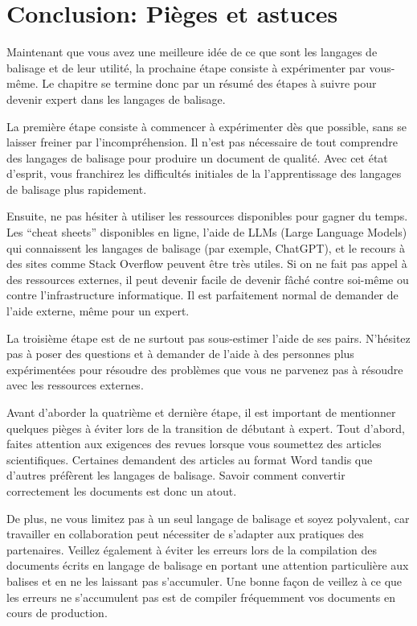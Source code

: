 \documentclass[
  letterpaper,
  DIV=11,
  numbers=noendperiod]{scrreprt}
\begin{document}
\section{Conclusion: Pièges et
astuces}\label{conclusion-piuxe8ges-et-astuces}

Maintenant que vous avez une meilleure idée de ce que sont les langages
de balisage et de leur utilité, la prochaine étape consiste à
expérimenter par vous-même. Le chapitre se termine donc par un résumé
des étapes à suivre pour devenir expert dans les langages de balisage.

La première étape consiste à commencer à expérimenter dès que possible,
sans se laisser freiner par l'incompréhension. Il n'est pas nécessaire
de tout comprendre des langages de balisage pour produire un document de
qualité. Avec cet état d'esprit, vous franchirez les difficultés
initiales de la l'apprentissage des langages de balisage plus
rapidement.

Ensuite, ne pas hésiter à utiliser les ressources disponibles pour
gagner du temps. Les ``cheat sheets'' disponibles en ligne, l'aide de
LLMs (Large Language Models) qui connaissent les langages de balisage
(par exemple, ChatGPT), et le recours à des sites comme Stack Overflow
peuvent être très utiles. Si on ne fait pas appel à des ressources
externes, il peut devenir facile de devenir fâché contre soi-même ou
contre l'infrastructure informatique. Il est parfaitement normal de
demander de l'aide externe, même pour un expert.

La troisième étape est de ne surtout pas sous-estimer l'aide de ses
pairs. N'hésitez pas à poser des questions et à demander de l'aide à des
personnes plus expérimentées pour résoudre des problèmes que vous ne
parvenez pas à résoudre avec les ressources externes.

Avant d'aborder la quatrième et dernière étape, il est important de
mentionner quelques pièges à éviter lors de la transition de débutant à
expert. Tout d'abord, faites attention aux exigences des revues lorsque
vous soumettez des articles scientifiques. Certaines demandent des
articles au format Word tandis que d'autres préfèrent les langages de
balisage. Savoir comment convertir correctement les documents est donc
un atout.

De plus, ne vous limitez pas à un seul langage de balisage et soyez
polyvalent, car travailler en collaboration peut nécessiter de s'adapter
aux pratiques des partenaires. Veillez également à éviter les erreurs
lors de la compilation des documents écrits en langage de balisage en
portant une attention particulière aux balises et en ne les laissant pas
s'accumuler. Une bonne façon de veillez à ce que les erreurs ne
s'accumulent pas est de compiler fréquemment vos documents en cours de
production.
\end{document}
